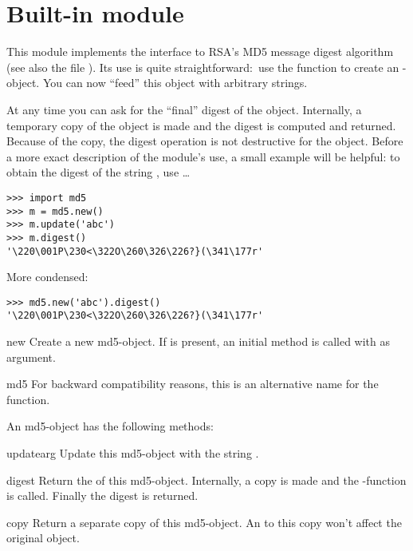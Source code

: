 \section{Built-in module }

This module implements the interface to RSA's MD5 message digest
algorithm (see also the file ). Its use is quite
straightforward:\ use the function  to create an
-object. You can now ``feed'' this object with arbitrary
strings.

At any time you can ask for the ``final'' digest of the object. Internally,
a temporary copy of the object is made and the digest is computed and
returned. Because of the copy, the digest operation is not destructive
for the object. Before a more exact description of the module's use, a small
example will be helpful: 
to obtain the digest of the string , use \ldots

\bcode\begin{verbatim}
>>> import md5
>>> m = md5.new()
>>> m.update('abc')
>>> m.digest()
'\220\001P\230<\322O\260\326\226?}(\341\177r'
\end{verbatim}\ecode

More condensed:

\bcode\begin{verbatim}
>>> md5.new('abc').digest()
'\220\001P\230<\322O\260\326\226?}(\341\177r'
\end{verbatim}\ecode

\renewcommand{\indexsubitem}{(in module md5)}

\begin{funcdesc}{new}{}
  Create a new md5-object. If  is present, an initial
   method is called with  as argument.
\end{funcdesc}

\begin{funcdesc}{md5}{}
For backward compatibility reasons, this is an alternative name for the
 function.
\end{funcdesc}

An md5-object has the following methods:

\renewcommand{\indexsubitem}{(md5 method)}
\begin{funcdesc}{update}{arg}
  Update this md5-object with the string .
\end{funcdesc}

\begin{funcdesc}{digest}{}
  Return the  of this md5-object. Internally, a copy is made
  and the \C-function  is called. Finally the digest is
  returned.
\end{funcdesc}

\begin{funcdesc}{copy}{}
  Return a separate copy of this md5-object.  An  to this
  copy won't affect the original object.
\end{funcdesc}
